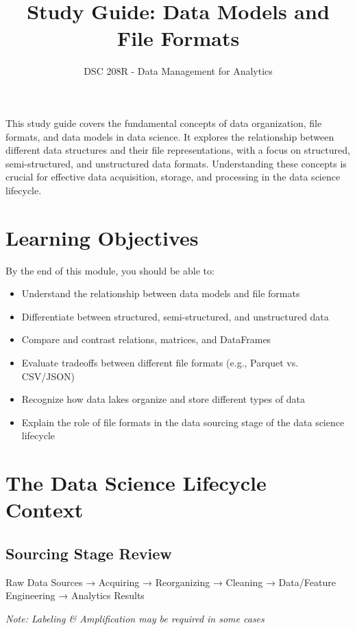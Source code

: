 \documentclass[12pt]{article}
\title{Study Guide: Data Models and File Formats}
\author{DSC 208R - Data Management for Analytics}
\date{}
\begin{document}
\maketitle

\begin{tcolorbox}[colback=blue!5!white,colframe=blue!75!black,title=Overview]
This study guide covers the fundamental concepts of data organization, file formats, and data models in data science. It explores the relationship between different data structures and their file representations, with a focus on structured, semi-structured, and unstructured data formats. Understanding these concepts is crucial for effective data acquisition, storage, and processing in the data science lifecycle.
\end{tcolorbox}

\section{Learning Objectives}

By the end of this module, you should be able to:

\begin{itemize}
    \item Understand the relationship between data models and file formats
    \item Differentiate between structured, semi-structured, and unstructured data
    \item Compare and contrast relations, matrices, and DataFrames
    \item Evaluate tradeoffs between different file formats (e.g., Parquet vs. CSV/JSON)
    \item Recognize how data lakes organize and store different types of data
    \item Explain the role of file formats in the data sourcing stage of the data science lifecycle
\end{itemize}

\section{The Data Science Lifecycle Context}

\subsection{Sourcing Stage Review}
\begin{tcolorbox}[colback=green!5!white,colframe=green!75!black,title=Sourcing Process Flow]
Raw Data Sources → Acquiring → Reorganizing → Cleaning → Data/Feature Engineering → Analytics Results

\textit{Note: Labeling \& Amplification may be required in some cases}
\end{tcolorbox}
\end{document}
